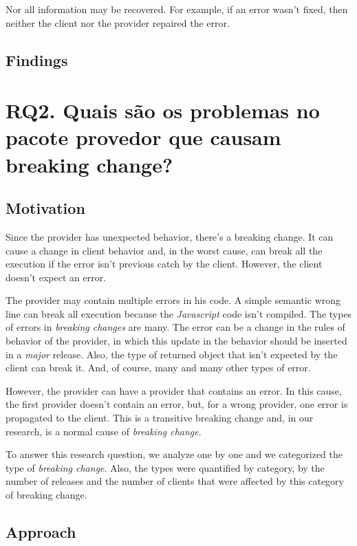 Nor all information may be recovered. For example, if an error wasn't fixed, then neither the client nor the provider repaired the error.

\subsection{Findings}
\label{fin:rq1}

\section{RQ2. Quais são os problemas no pacote provedor que causam breaking change?}
\label{sec:rq2}

\subsection{Motivation}
\label{mot:rq2}

Since the provider has unexpected behavior, there's a breaking change. It can cause a change in client behavior and, in the worst cause, can break all the execution if the error isn't previous catch by the client. However, the client doesn't expect an error.

The provider may contain multiple errors in his code. A simple semantic wrong line can break all execution because the \textit{Javascript} code isn't compiled. The types of errors in \textit{breaking changes} are many.  The error can be a change in the rules of behavior of the provider, in which this update in the behavior should be inserted in a \textit{major} release. Also, the type of returned object that isn't expected by the client can break it. And, of course, many and many other types of error.

However, the provider can have a provider that contains an error. In this cause, the first provider doesn't contain an error, but, for a wrong provider, one error is propagated to the client. This is a transitive breaking change and, in our research, is a normal cause of \textit{breaking change}.

To answer this research question, we analyze one by one and we categorized the type of \textit{breaking change}. Also, the types were quantified by category, by the number of releases and the number of clients that were affected by this category of breaking change.

\subsection{Approach}
\label{apr:rq2}


